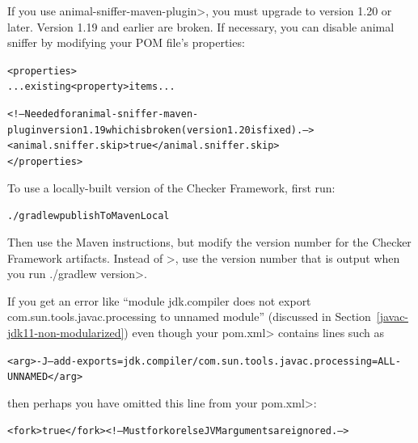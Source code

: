 If you use \<animal-sniffer-maven-plugin>, you must upgrade to version 1.20
or later.  Version 1.19 and earlier are broken.  If necessary, you can
disable animal sniffer by modifying your POM file's properties:

\begin{mysmall}
\begin{alltt}
  <properties>
    ... existing <property> items ...

    <!-- Needed for animal-sniffer-maven-plugin version 1.19 which is broken (version 1.20 is fixed). -->
    <animal.sniffer.skip>true</animal.sniffer.skip>
  </properties>
\end{alltt}
\end{mysmall}



To use a locally-built version of the Checker Framework, first run:

\begin{alltt}
./gradlew publishToMavenLocal
\end{alltt}

\noindent
Then use the Maven instructions, but modify the version number for the
Checker Framework artifacts.  Instead of \<\ReleaseVersion{}>, use the
version number that is output when you run \<./gradlew version>.



If you get an error like ``module jdk.compiler does not export
com.sun.tools.javac.processing to unnamed module'' (discussed in
Section~\ref{javac-jdk11-non-modularized}) even though your \<pom.xml>
contains lines such as

\begin{mysmall}
\begin{alltt}
  <arg>-J--add-exports=jdk.compiler/com.sun.tools.javac.processing=ALL-UNNAMED</arg>
\end{alltt}
\end{mysmall}

\noindent
then perhaps you have omitted this line from your \<pom.xml>:

\begin{mysmall}
\begin{alltt}
          <fork>true</fork> <!-- Must fork or else JVM arguments are ignored. -->
\end{alltt}
\end{mysmall}


